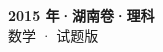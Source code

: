 \documentclass[zihao=-4, a4paper]{ctexart}
\begin{document}
\begin{center}
  {\Large\bfseries 2015 年·湖南卷·理科}\\[4pt]
  {\large 数学 · 试题版}
\end{center}
\medskip
{}

\end{document}
